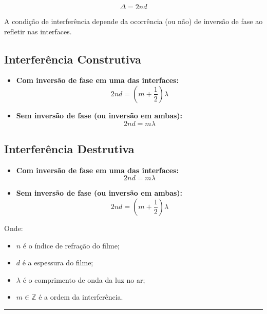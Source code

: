 \documentclass[a4paper,12pt]{article}
\begin{document}
\[
\Delta = 2nd
\]

A condição de interferência depende da ocorrência (ou não) de inversão de fase ao refletir nas interfaces. 

\subsection*{Interferência Construtiva}

\begin{itemize}
  \item \textbf{Com inversão de fase em uma das interfaces:}
  \[
  2nd = \left( m + \frac{1}{2} \right) \lambda
  \]
  
  \item \textbf{Sem inversão de fase (ou inversão em ambas):}
  \[
  2nd = m \lambda
  \]
\end{itemize}

\subsection*{Interferência Destrutiva}

\begin{itemize}
  \item \textbf{Com inversão de fase em uma das interfaces:}
  \[
  2nd = m \lambda
  \]
  
  \item \textbf{Sem inversão de fase (ou inversão em ambas):}
  \[
  2nd = \left( m + \frac{1}{2} \right) \lambda
  \]
\end{itemize}

\noindent Onde:
\begin{itemize}
  \item \( n \) é o índice de refração do filme;
  \item \( d \) é a espessura do filme;
  \item \( \lambda \) é o comprimento de onda da luz no ar;
  \item \( m \in \mathbb{Z} \) é a ordem da interferência.
\end{itemize}

\noindent\rule{\linewidth}{0.6pt}\\
\end{document}
